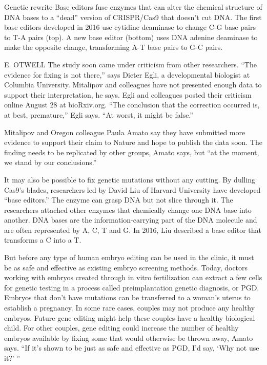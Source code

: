 \documentclass[12pt]{article}
\begin{document}
Genetic rewrite
Base editors fuse enzymes that can alter the chemical structure of DNA bases to a “dead” version of CRISPR/Cas9 that doesn’t cut DNA. The first base editors developed in 2016 use cytidine deaminase to change C-G base pairs to T-A pairs (top). A new base editor (bottom) uses DNA adenine deaminase to make the opposite change, transforming A-T base pairs to G-C pairs.


E. OTWELL
The study soon came under criticism from other researchers. “The evidence for fixing is not there,” says Dieter Egli, a developmental biologist at Columbia University. Mitalipov and colleagues have not presented enough data to support their interpretation, he says. Egli and colleagues posted their criticism online August 28 at bioRxiv.org. “The conclusion that the correction occurred is, at best, premature,” Egli says. “At worst, it might be false.”

Mitalipov and Oregon colleague Paula Amato say they have submitted more evidence to support their claim to Nature and hope to publish the data soon. The finding needs to be replicated by other groups, Amato says, but “at the moment, we stand by our conclusions.”

It may also be possible to fix genetic mutations without any cutting. By dulling Cas9’s blades, researchers led by David Liu of Harvard University have developed “base editors.” The enzyme can grasp DNA but not slice through it. The researchers attached other enzymes that chemically change one DNA base into another. DNA bases are the information-carrying part of the DNA molecule and are often represented by A, C, T and G. In 2016, Liu described a base editor that transforms a C into a T.


But before any type of human embryo editing can be used in the clinic, it must be as safe and effective as existing embryo screening methods. Today, doctors working with embryos created through in vitro fertilization can extract a few cells for genetic testing in a process called preimplantation genetic diagnosis, or PGD. Embryos that don’t have mutations can be transferred to a woman’s uterus to establish a pregnancy. In some rare cases, couples may not produce any healthy embryos. Future gene editing might help these couples have a healthy biological child. For other couples, gene editing could increase the number of healthy embryos available by fixing some that would otherwise be thrown away, Amato says. “If it’s shown to be just as safe and effective as PGD, I’d say, ‘Why not use it?’ ”
\end{document}
